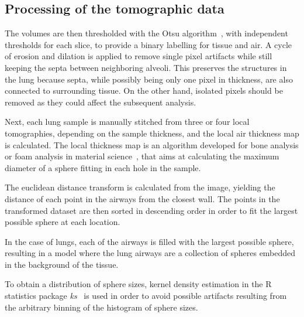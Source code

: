 
\subsection{Processing of the tomographic data}\label{sec:tomoprocessing}
The volumes
are then thresholded with the Otsu algorithm~\cite{Otsu_1979}, with independent thresholds
for each slice, to provide a binary labelling for tissue and air. A cycle of
erosion and dilation is applied to remove single pixel artifacts while still
keeping the septa between neighboring alveoli. This preserves the structures
in the lung because septa, while possibly being only one pixel in thickness,
are also connected to surrounding tissue. On the other hand, isolated pixels
should be removed as they could affect the subsequent analysis.

Next, each lung sample is manually stitched from three or four local
tomographies, depending on the sample thickness, and the local air thickness
map is calculated. The local thickness map is an algorithm developed for
bone analysis or foam analysis in material science~\cite{6778077}, that aims
at calculating the maximum diameter of a sphere fitting in each hole in the
sample.

The euclidean distance transform is calculated from the image, yielding the
distance of each point in the airways from the closest wall. The points in
the transformed dataset are then sorted in descending order in order to fit
the largest possible sphere at each location.

In the case of lungs, each of the airways is filled with the largest possible
sphere, resulting in a model where the lung airways are a collection of
spheres embedded in the background of the tissue.

To obtain a distribution of sphere sizes, kernel density estimation in the R
statistics package \emph{ks}~\cite{JSSv021i07} is used in order to avoid possible artifacts
resulting from the arbitrary binning of the histogram of sphere sizes.


